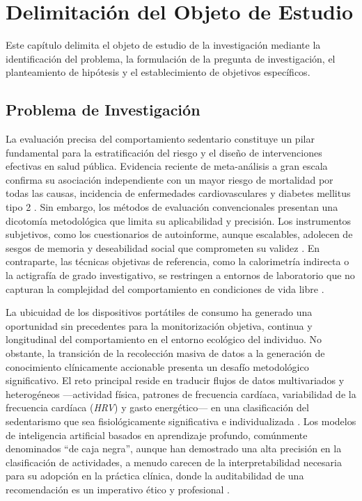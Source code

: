 ﻿\chapter{Delimitación del Objeto de Estudio}
\label{chap:delimitacion}

\noindent Este capítulo delimita el objeto de estudio de la investigación mediante la identificación del problema, la formulación de la pregunta de investigación, el planteamiento de hipótesis y el establecimiento de objetivos específicos.

\section{Problema de Investigación}
\label{sec:problema_investigacion}

La evaluación precisa del comportamiento sedentario constituye un pilar fundamental para la estratificación del riesgo y el diseño de intervenciones efectivas en salud pública. Evidencia reciente de meta-análisis a gran escala confirma su asociación independiente con un mayor riesgo de mortalidad por todas las causas, incidencia de enfermedades cardiovasculares y diabetes mellitus tipo 2 \cite{Katzmarzyk2023Impact,Santos2023CostInaction}. Sin embargo, los métodos de evaluación convencionales presentan una dicotomía metodológica que limita su aplicabilidad y precisión. Los instrumentos subjetivos, como los cuestionarios de autoinforme, aunque escalables, adolecen de sesgos de memoria y deseabilidad social que comprometen su validez \cite{Healy2024,Prince2008}. En contraparte, las técnicas objetivas de referencia, como la calorimetría indirecta o la actigrafía de grado investigativo, se restringen a entornos de laboratorio que no capturan la complejidad del comportamiento en condiciones de vida libre \cite{Migueles2022GRANADA}.

La ubicuidad de los dispositivos portátiles de consumo ha generado una oportunidad sin precedentes para la monitorización objetiva, continua y longitudinal del comportamiento en el entorno ecológico del individuo. No obstante, la transición de la recolección masiva de datos a la generación de conocimiento clínicamente accionable presenta un desafío metodológico significativo. El reto principal reside en traducir flujos de datos multivariados y heterogéneos ---actividad física, patrones de frecuencia cardíaca, variabilidad de la frecuencia cardíaca (\textit{HRV}) y gasto energético--- en una clasificación del sedentarismo que sea fisiológicamente significativa e individualizada \cite{Deka2023Nonlinear}. Los modelos de inteligencia artificial basados en aprendizaje profundo, comúnmente denominados ``de caja negra'', aunque han demostrado una alta precisión en la clasificación de actividades, a menudo carecen de la interpretabilidad necesaria para su adopción en la práctica clínica, donde la auditabilidad de una recomendación es un imperativo ético y profesional \cite{Vellido2020Importance}.

